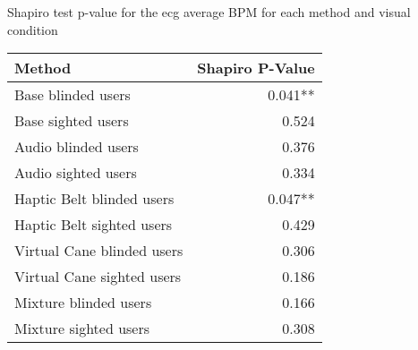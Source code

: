
\centering
\caption{Shapiro test p-value for the ecg average BPM for each method and visual condition}
\label{tab:shapiro_ecg_bpm}
\begin{tabular}{lr}
\toprule
                    Method & Shapiro P-Value \\
\midrule
        Base blinded users &         0.041** \\
        Base sighted users &           0.524 \\
       Audio blinded users &           0.376 \\
       Audio sighted users &           0.334 \\
 Haptic Belt blinded users &         0.047** \\
 Haptic Belt sighted users &           0.429 \\
Virtual Cane blinded users &           0.306 \\
Virtual Cane sighted users &           0.186 \\
     Mixture blinded users &           0.166 \\
     Mixture sighted users &           0.308 \\
\bottomrule
\end{tabular}
